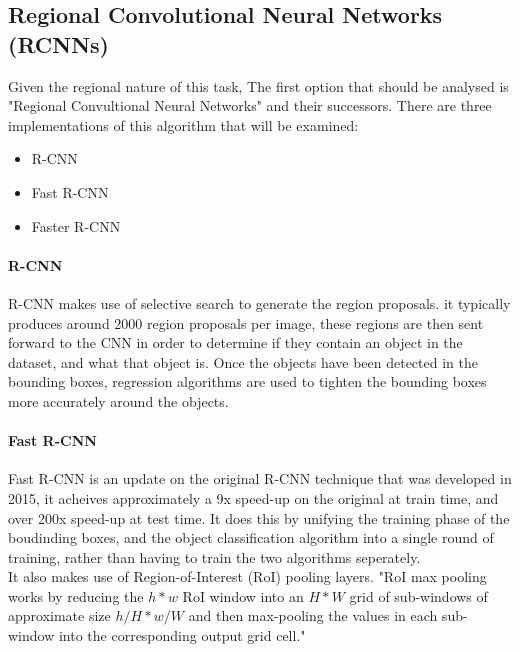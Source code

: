 \documentclass[10pt]{article}
\begin{document}
\subsection{Regional Convolutional Neural Networks (RCNNs)}
	Given the regional nature of this task, The first option that should be analysed is "Regional Convultional Neural Networks" and their successors. There are three implementations of this algorithm that will be examined:
	\begin{itemize}
		\item R-CNN \cite{rcnn}
		\item Fast R-CNN \cite{fast_rcnn}
		\item Faster R-CNN \cite{faster_rcnn}
	\end{itemize}
	
\paragraph{R-CNN}
R-CNN \cite{rcnn} makes use of selective search to generate the region proposals. it typically produces around 2000 region proposals per image, these regions are then sent forward to the CNN in order to determine if they contain an object in the dataset, and what that object is. Once the objects have been detected in the bounding boxes, regression algorithms are used to tighten the bounding boxes more accurately around the objects.

\paragraph{Fast R-CNN}
Fast R-CNN \cite{fast_rcnn} is an update on the original R-CNN technique that was developed in 2015, it acheives approximately a 9x speed-up on the original at train time, and over 200x speed-up at test time. It does this by unifying the training phase of the boudinding boxes, and the object classification algorithm into a single round of training, rather than having to train the two algorithms seperately. \\
It also makes use of Region-of-Interest (RoI) pooling layers. "RoI max pooling works by reducing the $h*w$ RoI window into an $H*W$ grid of sub-windows of approximate size $h/H * w/W$ and then max-pooling the values in each sub-window into the corresponding output grid cell."\cite{fast_rcnn}
\end{document}

